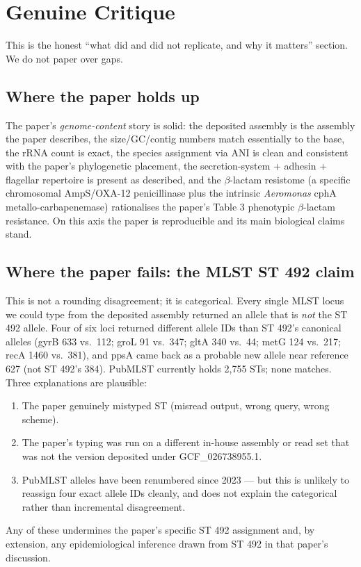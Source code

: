 \documentclass[11pt,letterpaper]{article}
\begin{document}
\section{Genuine Critique}
This is the honest ``what did and did not replicate, and why it matters'' section. We do not paper over gaps.

\subsection*{Where the paper holds up}
The paper's \emph{genome-content} story is solid: the deposited assembly is the assembly the paper describes, the size/GC/contig numbers match essentially to the base, the rRNA count is exact, the species assignment via ANI is clean and consistent with the paper's phylogenetic placement, the secretion-system + adhesin + flagellar repertoire is present as described, and the $\beta$-lactam resistome (a specific chromosomal AmpS/OXA-12 penicillinase plus the intrinsic \textit{Aeromonas} cphA metallo-carbapenemase) rationalises the paper's Table 3 phenotypic $\beta$-lactam resistance. On this axis the paper is reproducible and its main biological claims stand.

\subsection*{Where the paper fails: the MLST ST 492 claim}
This is not a rounding disagreement; it is categorical. Every single MLST locus we could type from the deposited assembly returned an allele that is \emph{not} the ST 492 allele. Four of six loci returned different allele IDs than ST 492's canonical alleles (gyrB 633 vs.\ 112; groL 91 vs.\ 347; gltA 340 vs.\ 44; metG 124 vs.\ 217; recA 1460 vs.\ 381), and ppsA came back as a probable new allele near reference 627 (not ST 492's 384). PubMLST currently holds 2{,}755 STs; none matches. Three explanations are plausible:
\begin{enumerate}
  \item The paper genuinely mistyped ST (misread output, wrong query, wrong scheme).
  \item The paper's typing was run on a different in-house assembly or read set that was not the version deposited under GCF\_026738955.1.
  \item PubMLST alleles have been renumbered since 2023 --- but this is unlikely to reassign four exact allele IDs cleanly, and does not explain the categorical rather than incremental disagreement.
\end{enumerate}
Any of these undermines the paper's specific ST 492 assignment and, by extension, any epidemiological inference drawn from ST 492 in that paper's discussion.
\end{document}
